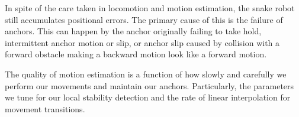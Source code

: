 In spite of the care taken in locomotion and motion estimation, the snake robot still accumulates positional errors.  The primary cause of this is the failure of anchors.   This can happen by the anchor originally failing to take hold, intermittent anchor motion or slip, or anchor slip caused by collision with a forward obstacle making a backward motion look like a forward motion.



The quality of motion estimation is a function of how slowly and carefully we perform our movements and maintain our anchors.  Particularly, the parameters we tune for our local stability detection and the rate of linear interpolation for movement transitions.




